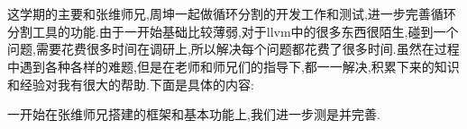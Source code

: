 \section{}

\subsection{}

\par{这学期的主要和张维师兄,周坤一起做循环分割的开发工作和测试,进一步完善循环分割工具的功能.由于一开始基础比较薄弱,对于llvm中的很多东西很陌生,碰到一个问题,需要花费很多时间在调研上,所以解决每个问题都花费了很多时间.虽然在过程中遇到各种各样的难题,但是在老师和师兄们的指导下,都一一解决,积累下来的知识和经验对我有很大的帮助.下面是具体的内容:}
\par{一开始在张维师兄搭建的框架和基本功能上,我们进一步测是并完善.}


